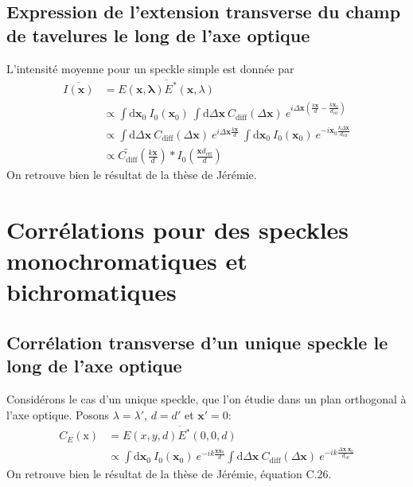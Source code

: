 \subsection{Expression de l'extension transverse du champ de tavelures le long de l'axe optique}
L'intensité moyenne pour un speckle simple est donnée par
\begin{align}
\overline{I(\mathbf{x})} &= \overline{E(\mathbf{x,\lambda})E^*(\mathbf{x},\lambda)} \\
&\propto \int{\mathrm{d}\mathbf{x}_0 \: I_0(\mathbf{x}_0) \: \int{\mathrm{d}\Delta \mathbf{x} \: C_{\mathrm{diff}}(\Delta \mathbf{x}) \: e^{i\Delta \mathbf{x} \left( \frac{k\mathbf{x}}{d}-\frac{k\mathbf{x}_0}{d_{\mathrm{eff}}}\right)}}} \\
&\propto \int{\mathrm{d}\Delta\mathbf{x} \: C_{\mathrm{diff}}(\Delta\mathbf{x}) \: e^{i \Delta\mathbf{x} \frac{k\mathbf{x}}{d}} \: \int{\mathrm{d}\mathbf{x}_0 \: I_0(\mathbf{x}_0) \: e^{-i \mathbf{x}_0 \frac{k\Delta\mathbf{x}}{d_{\mathrm{eff}}}}}} \\
&\propto \widetilde{C_{\mathrm{diff}}}(\frac{k\mathbf{x}}{d}) \ast I_0(\frac{\mathbf{x}d_{\mathrm{eff}}}{d})
\end{align}
On retrouve bien le résultat de la thèse de Jérémie.

\section{Corrélations pour des speckles monochromatiques et bichromatiques}
\subsection{Corrélation transverse d'un unique speckle le long de l'axe optique}
Considérons le cas d'un unique speckle, que l'on étudie dans un plan orthogonal à l'axe optique. Posons $\lambda = \lambda'$, $d=d'$ et $\mathbf{x}'=0$:
\begin{align}
C_E(\mathrm{x})&=\overline{E(x,y,d)E^*(0,0,d)}\\
&\propto \int{\mathrm{d}\mathbf{x}_0 \: I_0(\mathbf{x}_0) \: e^{-ik\frac{\mathbf{x} \mathbf{x}_0}{d}} \int{\mathrm{d}\Delta\mathbf{x} \: C_{\mathrm{diff}}(\Delta\mathbf{x})\: e^{-ik\frac{\Delta\mathbf{x}.\mathbf{x}_0}{d_{\mathrm{eff}}}}}}
\end{align}
On retrouve bien le résultat de la thèse de Jérémie, équation C.26.

